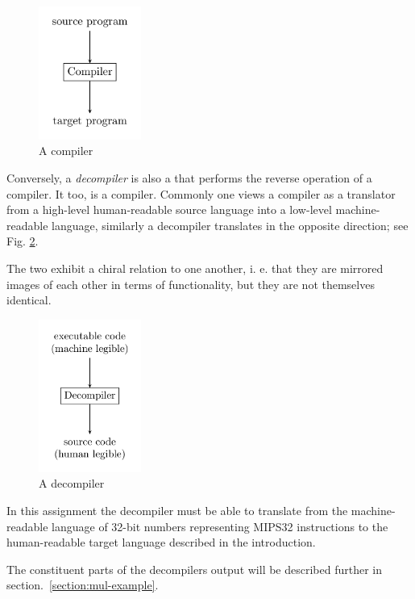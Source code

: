 \documentclass[a4paper]{article}
\begin{document}
\begin{figure}[H]
  \centering
  \includegraphics[width=0.3\textwidth]{figures/compiler.png}
  \caption{A compiler}
  \label{fig:compiler}
\end{figure}

Conversely, a \emph{decompiler} is also a that performs the reverse
operation of a compiler. It too, is a compiler. Commonly one views a
compiler as a translator from a high-level human-readable source
language into a low-level machine-readable language, similarly a
decompiler translates in the opposite direction; see
Fig. \ref{fig:decompiler}. 

The two exhibit a chiral relation to one another, i. e. that they are
mirrored images of each other in terms of functionality, but they are
not themselves identical.

\begin{figure}[H]
  \centering
  \includegraphics[width=0.3\textwidth]{figures/decompiler.png}
  \caption{A decompiler}
  \label{fig:decompiler}
\end{figure}

In this assignment the decompiler must be able to translate from the
machine-readable language of 32-bit numbers representing MIPS32
instructions to the human-readable target language described in the
introduction.

The constituent parts of the decompilers output will
be described further in section.~\ref{section:mul-example}.
\end{document}
